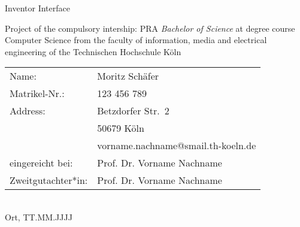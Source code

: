 \begin{titlepage}
%
\sffamily%
%
\begin{center}
\end{center}
%
\vfill
%
\begin{huge}
Inventor Interface\\[10mm]
\end{huge}
%
Project of the compulsory intership: PRA\newline
\emph{Bachelor of Science}\newline
at degree course Computer Science\newline
from the faculty of information, media and electrical engineering \newline
of the Technischen Hochschule Köln
%
\vfill
%
\begin{tabular}{@{}ll}
Name: & Moritz Schäfer\\
Matrikel-Nr.:  & 123 456 789\\
Address:       & Betzdorfer Str.~2\\
               & 50679 Köln\\
               & vorname.nachname@smail.th-koeln.de\\[5mm]
eingereicht bei:   & Prof. Dr. Vorname Nachname\\
Zweitgutachter*in: & Prof. Dr. Vorname Nachname
\end{tabular}	
%
\\[10mm]
%
Ort, TT.MM.JJJJ%
%
\rmfamily%
%
\end{titlepage}